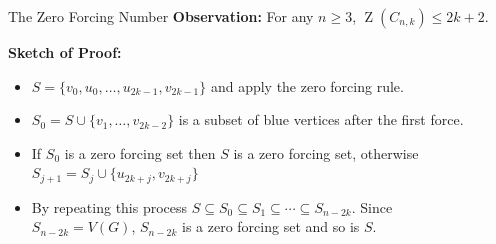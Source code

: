 \documentclass[final]{beamer}
\def\red{\color{red}}
\newcommand{\Z}{\operatorname{Z}}
\begin{document}
\begin{frame}{}
\begin{columns}[t]
\begin{column}{0.38\linewidth}



     

\end{column}%
    
    

\begin{column}{0.38 \linewidth}

   
        
\begin{block}{\red The Zero Forcing Number}
        {\bf Observation:} For any $ n \geq 3 $, $ \Z(C_{n,k}) \leq 2k + 2 $.
        
\textbf{Sketch of Proof:}
\begin{itemize}
\item $S = \{v_0, u_0, \dots, u_{2k-1}, v_{2k-1}\}$ and apply the zero forcing rule.\\
\item $S_0 = S \cup \{v_1, \dots, v_{2k-2}\}$ is a subset of blue vertices
after the first force.\\
\item If $S_0 $ is a zero forcing set then $S$ is a zero forcing set, otherwise $S_{j+1} = S_j \cup \{u_{2k+j},v_{2k+j}\}$\\
\item By repeating this process $S\subseteq S_0 \subseteq S_1 \subseteq \cdots
\subseteq S_{n-2k}$. Since $S_{n-2k} = V(G)$, $S_{n-2k}$ is a zero forcing set and so is $S$.
\end{itemize}

\end{block}


\end{column}
\end{columns}
\end{frame}
\end{document}
